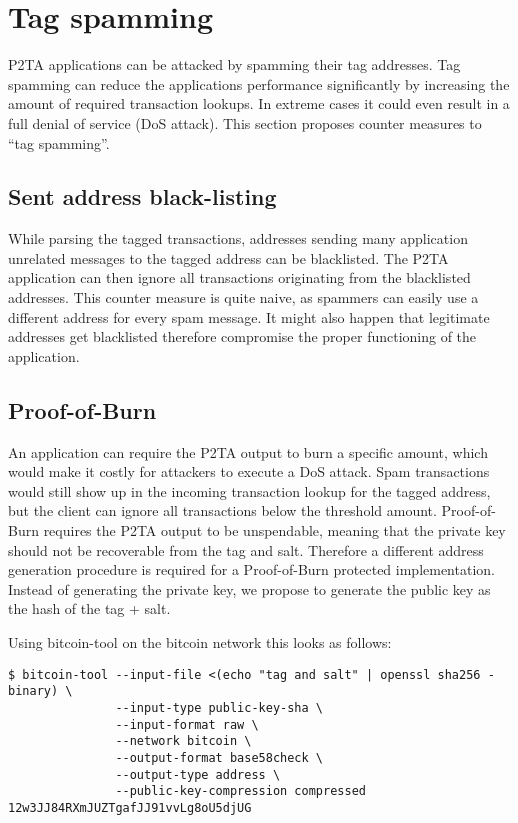 \documentclass[a4paper,10pt]{article}
\begin{document}
\section{Tag spamming}
P2TA applications can be attacked by spamming their tag addresses.
Tag spamming can reduce the applications performance significantly by increasing the amount of required transaction lookups.
In extreme cases it could even result in a full denial of service (DoS attack).
This section proposes counter measures to ``tag spamming''.

\subsection{Sent address black-listing}
While parsing the tagged transactions, addresses sending many application unrelated messages to the tagged address can be blacklisted.
The P2TA application can then ignore all transactions originating from the blacklisted addresses.
This counter measure is quite naive, as spammers can easily use a different address for every spam message.
It might also happen that legitimate addresses get blacklisted therefore compromise the proper functioning of the application.

\subsection{Proof-of-Burn}
An application can require the P2TA output to burn a specific amount,
which would make it costly for attackers to execute a DoS attack.
Spam transactions would still show up in the incoming transaction lookup for the tagged address,
but the client can ignore all transactions below the threshold amount.
Proof-of-Burn requires the P2TA output to be unspendable, meaning that the private key should not be recoverable from the tag and salt.
Therefore a different address generation procedure is required for a Proof-of-Burn protected implementation.
Instead of generating the private key, we propose to generate the public key as the hash of the tag + salt.

Using bitcoin-tool on the bitcoin network this looks as follows:
\begin{small}\begin{verbatim}
$ bitcoin-tool --input-file <(echo "tag and salt" | openssl sha256 -binary) \
               --input-type public-key-sha \
               --input-format raw \
               --network bitcoin \
               --output-format base58check \
               --output-type address \
               --public-key-compression compressed
12w3JJ84RXmJUZTgafJJ91vvLg8oU5djUG
\end{verbatim}\end{small}
\end{document}
